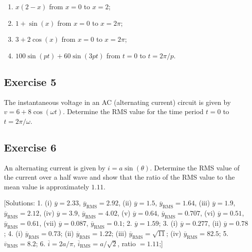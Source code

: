 \documentclass[
  english,
  11pt,
  oneside]{book}
\providecommand{\tightlist}{%
  \setlength{\itemsep}{0pt}\setlength{\parskip}{0pt}}
\newcommand{\slide}{}
\theoremstyle{definition}
\theoremstyle{definition}
\theoremstyle{definition}
\theoremstyle{definition}
\theoremstyle{remark}
\begin{document}
\begin{enumerate}
\def\labelenumi{\roman{enumi}.}
\tightlist
\item
  \(x(2-x)\) from \(x=0\) to \(x=2\);
\item
  \(1+\sin(x)\) from \(x=0\) to \(x=2\pi\);
\item
  \(3+2\cos(x)\) from \(x=0\) to \(x=2\pi\);
\item
  \(100\sin(pt)+60\sin(3pt)\) from \(t=0\) to \(t=2\pi/p\).
\end{enumerate}

\slide

\subsection*{Exercise 5}\label{exercise-5-4}

The instantaneous voltage in an AC (alternating current) circuit is given by \(v = 6 + 8\cos(\omega t)\).
Determine the RMS value for the time period \(t = 0\) to \(t = 2\pi/\omega\).

\slide

\subsection*{Exercise 6}\label{exercise-6-4}

An alternating current is given by \(i = a\sin(\theta)\). Determine the RMS value of the current over a half wave and show that the ratio of the RMS value to the mean value is approximately \(1.11\).

{[}Solutions:
1. (i) \(\overline{y}=2.33\), \(\overline{y}_{\text{RMS}}=2.92\), (ii) \(\overline{y}=1.5\), \(\overline{y}_{\text{RMS}}=1.64\), (iii) \(\overline{y}=1.9\), \(\overline{y}_{\text{RMS}}=2.12\), (iv) \(\overline{y}=3.9\), \(\overline{y}_{\text{RMS}}=4.02\), (v) \(\overline{y}=0.64\), \(\overline{y}_{\text{RMS}}=0.707\), (vi) \(\overline{y}=0.51\), \(\overline{y}_{\text{RMS}}=0.61\), (vii) \(\overline{y}=0.087\), \(\overline{y}_{\text{RMS}}=0.1\);
2. \(\overline{y}=1.59\);
3. (i) \(\overline{y}=0.277\), (ii) \(\overline{y}=0.78\);
4. (i) \(\overline{y}_{\text{RMS}}=0.73\); (ii) \(\overline{y}_{\text{RMS}}=1.22\); (iii) \(\overline{y}_{\text{RMS}}=\sqrt{11}\); (iv) \(\overline{y}_{\text{RMS}}=82.5\);
5. \(\overline{v}_{\text{RMS}}=8.2\);
6. \(\overline{i}=2a/\pi\), \(\overline{i}_{\text{RMS}}=a/\sqrt{2}\), ratio \(=1.11\);{]}
\end{document}
